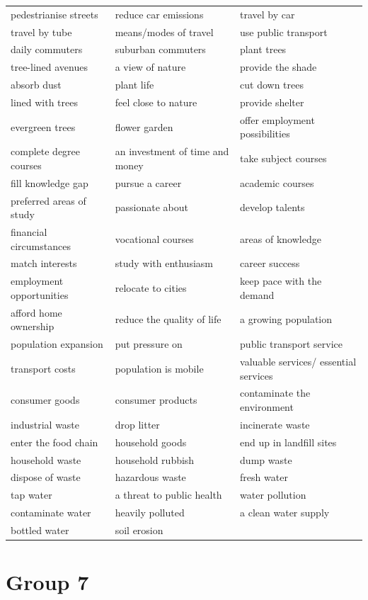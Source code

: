 \documentclass[10pt,a4paper]{article}
\begin{document}
{\begin{longtable}{@{}*{3}{p{}}@{}}
pedestrianise streets & reduce car emissions & travel by car \\
travel by tube & means/modes of travel & use public transport \\
daily commuters & suburban commuters & plant trees \\
tree-lined avenues & a view of nature & provide the shade \\
absorb dust & plant life & cut down trees \\
lined with trees & feel close to nature & provide shelter \\
evergreen trees & flower garden & offer employment possibilities \\
complete degree courses & an investment of time and money & take subject courses \\
fill knowledge gap & pursue a career & academic courses \\
preferred areas of study & passionate about & develop talents \\
financial circumstances & vocational courses & areas of knowledge \\
match interests & study with enthusiasm & career success \\
employment opportunities & relocate to cities & keep pace with the demand \\
afford home ownership & reduce the quality of life & a growing population \\
population expansion & put pressure on & public transport service \\
transport costs & population is mobile & valuable services/ essential services \\
consumer goods & consumer products & contaminate the environment \\
industrial waste & drop litter & incinerate waste \\
enter the food chain & household goods & end up in landfill sites \\
household waste & household rubbish & dump waste \\
dispose of waste & hazardous waste & fresh water \\
tap water & a threat to public health & water pollution \\
contaminate water & heavily polluted & a clean water supply \\
bottled water & soil erosion &  \\
\end{longtable}}

\section*{Group 7}
\end{document}
